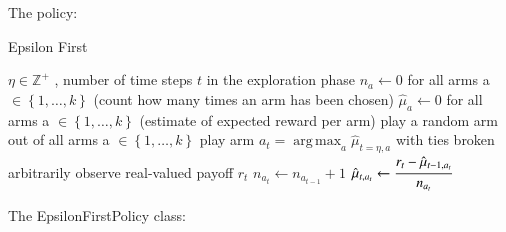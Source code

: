 \documentclass[nojss]{jss}\usepackage[]{graphicx}\usepackage[]{color}
\DeclareMathOperator*{\argmax}{arg\,max}
\begin{document}
The policy:

\begin{algorithm}
\caption{Epsilon First}
\label{Alg:EpsilonFirst}
\begin{algorithmic}
\REQUIRE \(   \eta \in \mathbb{Z}^{+} \)  , number of time steps $t$ in the exploration phase
\STATE \( n_{a} \leftarrow 0 \) for all arms a \(  \in \left\{ 1, \dots, k \right\} \)  (count how many times an arm has been chosen)
\STATE \( \hat{\mu}_{a} \leftarrow 0 \) for all arms a  \(   \in \left\{ 1, \dots, k \right\} \)  (estimate of expected reward per arm)
	       \STATE play a random arm out of all arms a \(   \in \left\{ 1, \dots, k \right\} \)
	\ELSE
	        \STATE play arm \(a_t = \argmax_a  \hat{\mu}_{t=\eta,a}  \) with ties broken arbitrarily
	\ENDIF
	\STATE observe real-valued payoff $r_t$
	\STATE \( n_{a_{t}} \leftarrow n_{a_{t-1}} + 1  \)
   \STATE \( \hat{\mu}_{t,a_{t}} \leftarrow   \cfrac{r_t - \hat{\mu}_{t-1,a_{t}} }{n_{a_{t}}}   \)
\ENDFOR
\end{algorithmic}
\end{algorithm}


The EpsilonFirstPolicy class:
\end{document}
